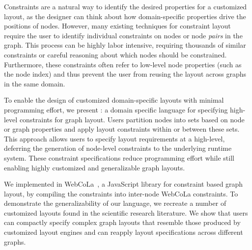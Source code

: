 Constraints are a natural way to identify the desired properties for a
customized layout, as the designer can think about how domain-specific
properties drive the positions of nodes. However, many existing techniques
for constraint layout require the user to identify individual constraints
on nodes or node \emph{pairs} in the graph. This process can be highly labor
intensive, requiring thousands of similar constraints or careful reasoning
about which nodes should be constrained. Furthermore, these constraints often
refer to low-level node properties (such as the node index) and thus prevent
the user from reusing the layout across graphs in the same domain.

To enable the design of customized domain-specific layouts with minimal
programming effort, we present \projectname: a domain specific language for
specifying high-level constraints for graph layout. Users partition nodes
into sets based on node or graph properties and apply layout constraints
within or between these sets. This approach allows users to specify layout
requirements at a high-level, deferring the generation of
node-level constraints to the underlying runtime system. These constraint
specifications reduce programming effort while still enabling highly
customized and generalizable graph layouts.

We implemented \projectname in 
WebCoLa~\cite{WebCoLa}, a JavaScript library for constraint based graph
layout, by compiling the \projectname constraints into inter-node WebCoLa constraints.
To demonstrate the generalizability of our language, we
recreate a number of customized layouts found in the scientific research 
literature. We
show that users can compactly specify complex graph layouts that resemble
those produced by customized layout engines and can reapply layout
specifications across different graphs.
